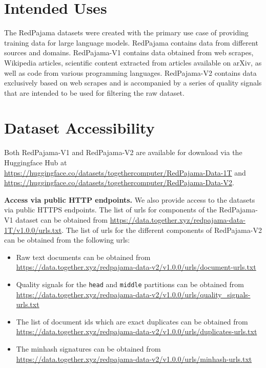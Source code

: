 \documentclass{article}
\begin{document}



\newpage
\appendix


















\section{Intended Uses}
The RedPajama datasets were created with the primary use case of providing training data for large language models. RedPajama contains data from different sources and domains. RedPajama-V1 contains data obtained from web scrapes, Wikipedia articles, scientific content extracted from articles available on arXiv, as well as code from various programming languages. RedPajama-V2 contains data exclusively based on web scrapes and is accompanied by a series of quality signals that are intended to be used for filtering the raw dataset.

\section{Dataset Accessibility}
Both RedPajama-V1 and RedPajama-V2 are available for download via the Huggingface Hub at \url{https://huggingface.co/datasets/togethercomputer/RedPajama-Data-1T} and \url{https://huggingface.co/datasets/togethercomputer/RedPajama-Data-V2}. 

{\bf Access via public HTTP endpoints.} We also provide access to the datasets via public HTTPS endpoints. The list of urls for components of the RedPajama-V1 dataset can be obtained from \url{https://data.together.xyz/redpajama-data-1T/v1.0.0/urls.txt}. The list of urls for the different components of RedPajama-V2 can be obtained from the following urls:
\begin{itemize}%
    \item Raw text documents can be obtained from \url{https://data.together.xyz/redpajama-data-v2/v1.0.0/urls/document-urls.txt}
    \item Quality signals for the \texttt{head} and \texttt{middle} partitions can be obtained from \url{https://data.together.xyz/redpajama-data-v2/v1.0.0/urls/quality_signals-urls.txt}
    \item The list of document ids which are exact duplicates can be obtained from \url{https://data.together.xyz/redpajama-data-v2/v1.0.0/urls/duplicates-urls.txt}
    \item The minhash signatures can be obtained from \url{https://data.together.xyz/redpajama-data-v2/v1.0.0/urls/minhash-urls.txt}
\end{itemize}
\end{document}
